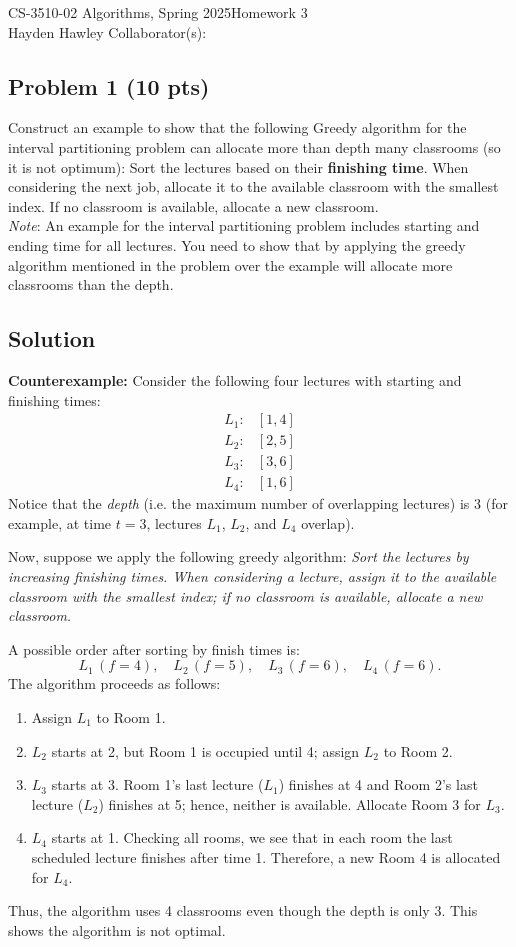 \documentclass[12pt]{article}
\begin{document}
\noindent CS-3510-02 Algorithms, Spring 2025\hfill Homework 3\\
Hayden Hawley \hfill Collaborator(s):

\hrulefill

\subsection*{Problem 1 (10 pts)}
Construct an example to show that the following Greedy algorithm for the interval partitioning problem can allocate more than depth many classrooms (so it is not optimum): Sort the lectures based on their \textbf{finishing time}. When considering the next job, allocate it to the available classroom with the smallest index. If no classroom is available, allocate a new classroom. \\
\noindent \textit{Note}: An example for the interval partitioning problem includes starting and ending time for all lectures. You need to show that by applying the greedy algorithm mentioned in the problem over the example will allocate more classrooms than the depth.

\subsection*{Solution}
\textbf{Counterexample:} Consider the following four lectures with starting and finishing times:
\[
\begin{array}{ll}
L_1: & [1,4] \\
L_2: & [2,5] \\
L_3: & [3,6] \\
L_4: & [1,6]
\end{array}
\]
Notice that the \emph{depth} (i.e. the maximum number of overlapping lectures) is 3 (for example, at time \(t=3\), lectures \(L_1\), \(L_2\), and \(L_4\) overlap).

Now, suppose we apply the following greedy algorithm: \emph{Sort the lectures by increasing finishing times. When considering a lecture, assign it to the available classroom with the smallest index; if no classroom is available, allocate a new classroom.}

A possible order after sorting by finish times is:
\[
L_1 \,(f=4), \quad L_2 \,(f=5), \quad L_3 \,(f=6), \quad L_4 \,(f=6).
\]
The algorithm proceeds as follows:
\begin{enumerate}
    \item Assign \(L_1\) to Room 1.
    \item \(L_2\) starts at 2, but Room 1 is occupied until 4; assign \(L_2\) to Room 2.
    \item \(L_3\) starts at 3. Room 1's last lecture (\(L_1\)) finishes at 4 and Room 2's last lecture (\(L_2\)) finishes at 5; hence, neither is available. Allocate Room 3 for \(L_3\).
    \item \(L_4\) starts at 1. Checking all rooms, we see that in each room the last scheduled lecture finishes after time 1. Therefore, a new Room 4 is allocated for \(L_4\).
\end{enumerate}
Thus, the algorithm uses 4 classrooms even though the depth is only 3. This shows the algorithm is not optimal.
\end{document}
